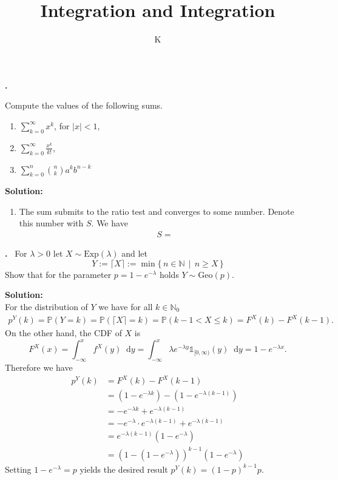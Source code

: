 \documentclass[a4paper]{article}
\title{Integration and Integration}
\author{K}
\theoremstyle{definition}
\newcommand*\diff{\mathop{}\!\mathrm{d}}
\newcounter{problem}
\newcounter{solution}
\newcommand\Problem{%
    \stepcounter{problem}%
    \textbf{\theproblem.}~%
    \setcounter{solution}{0}%
  }
\newcommand\TheSolution{%
    \textbf{Solution:}\\%
  }
\begin{document}
\Problem{
  Compute the values of the following sums.
  \begin{enumerate}
      \item \(\sum_{k=0}^\infty x^k\), for \(|x| < 1\),
      \item \(\sum_{k=0}^\infty \frac{x^k}{k!}\),
      \item \(\sum_{k=0}^n \binom{n}{k} a^k b^{n-k}\)
  \end{enumerate}
}

\TheSolution{
  \begin{enumerate}
      \item The sum submits to the ratio test and converges to some number. Denote this number with \(S\). We have
      \begin{align}
          S = 
      \end{align}
  \end{enumerate}
}

\Problem{
  For \(\lambda > 0\) let \(X \sim \text{Exp}(\lambda)\) and let
  \begin{equation}
    Y := \lceil{X} \rceil := \min \{\, n \in \mathbb{N} \, \mid \, n \geq X \, \}
  \end{equation}
  Show that for the parameter \(p = 1 - e^{-\lambda}\) holds \(Y \sim \text{Geo}(p)\).
}

\TheSolution{
  For the distribution of \(Y\) we have for all \(k \in \mathbb{N}_0\)
  \begin{align}
    p^Y (k) = \mathbb{P}(Y = k) = \mathbb{P}(\lceil{X} \rceil = k) = \mathbb{P}(k - 1 < X \leq k) = F^X (k) - F^X(k - 1) \text{.}
  \end{align}
  On the other hand, the CDF of \(X\) is
  \begin{equation}
    F^X (x) = \int_{-\infty}^x f^X(y) \diff y = \int_{-\infty}^x \lambda e^{-\lambda y} \mathds{1}_{[0, \infty)}(y) \diff y = 1 - e^{-\lambda x} \text{.}
  \end{equation}
  Therefore we have
  \begin{align}
    p^Y (k) &= F^X (k) - F^X(k - 1) \\
    &= (1 - e^{-\lambda k}) - (1 - e^{-\lambda (k - 1)}) \\
    &= - e^{-\lambda k} + e^{-\lambda (k - 1)} \\
    &= - e^{-\lambda} \cdot e^{-\lambda (k - 1)} + e^{-\lambda (k - 1)} \\
    &= e^{-\lambda (k - 1)} (1 - e^{-\lambda}) \\
    &= \left(1 - \left(1 - e^{-\lambda}\right) \right)^{k - 1} (1 - e^{-\lambda})
  \end{align}
  Setting \(1 - e^{-\lambda} = p\) yields the desired result \(p^Y (k) = \left(1-p\right)^{k-1} p\).
}
\end{document}
